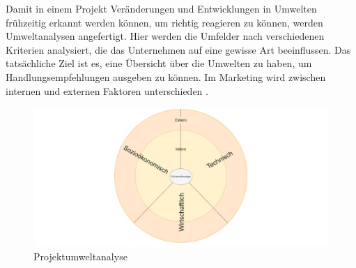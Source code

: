 Damit in einem Projekt Veränderungen und Entwicklungen in Umwelten frühzeitig erkannt werden können, um richtig reagieren zu können, werden Umweltanalysen angefertigt. Hier werden die Umfelder nach verschiedenen Kriterien analysiert, die das Unternehmen auf eine gewisse Art beeinflussen. Das tatsächliche Ziel ist es, eine Übersicht über die Umwelten zu haben, um Handlungsempfehlungen ausgeben zu können. Im Marketing wird zwischen internen und externen Faktoren unterschieden \cite{Wikipedia:2023, Redaktion:2024}.

\begin{figure}[H]
	\centering
	\includegraphics[width=15cm]{Bilder/Umweltanalyse}
	\caption{Projektumweltanalyse}
	\label{fig:umweltanalyse}
\end{figure}

